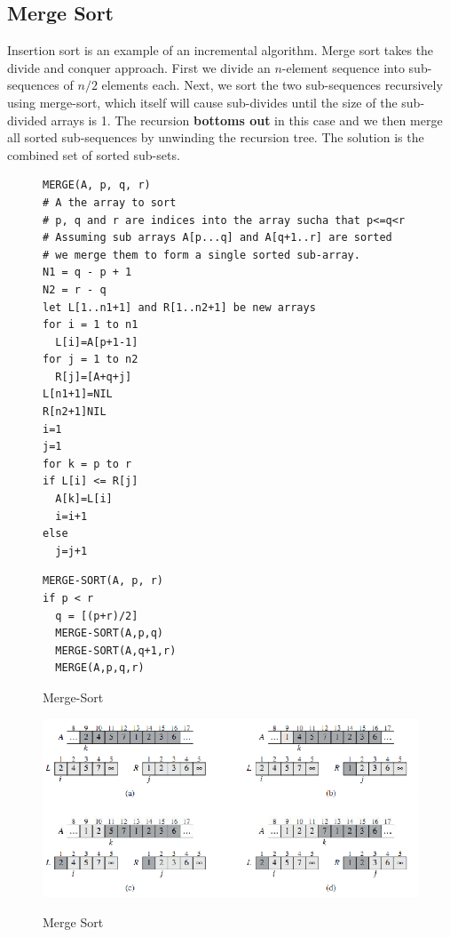 \documentclass[10pt,a4paper]{article}
\begin{document}
\subsection{Merge Sort}
Insertion sort is an example of an incremental algorithm. Merge sort takes the divide and conquer approach. First we divide an $n$-element sequence into sub-sequences of $n/2$ elements each. Next, we sort the two sub-sequences recursively using merge-sort, which itself will cause sub-divides until the size of the sub-divided arrays is 1. The recursion {\bf bottoms out} in this case and we then merge all sorted sub-sequences by unwinding the recursion tree. The solution is the combined set of sorted sub-sets. 
\begin{figure}
\caption{Merge-Sort}
\begin{center}
\begin{lstlisting}
MERGE(A, p, q, r)
# A the array to sort
# p, q and r are indices into the array sucha that p<=q<r
# Assuming sub arrays A[p...q] and A[q+1..r] are sorted
# we merge them to form a single sorted sub-array. 
N1 = q - p + 1
N2 = r - q
let L[1..n1+1] and R[1..n2+1] be new arrays
for i = 1 to n1
  L[i]=A[p+1-1]
for j = 1 to n2
  R[j]=[A+q+j]
L[n1+1]=NIL
R[n2+1]NIL
i=1
j=1
for k = p to r
if L[i] <= R[j]
  A[k]=L[i]
  i=i+1
else
  j=j+1
\end{lstlisting}
\begin{lstlisting}
MERGE-SORT(A, p, r)
if p < r
  q = [(p+r)/2]
  MERGE-SORT(A,p,q)
  MERGE-SORT(A,q+1,r)
  MERGE(A,p,q,r)
\end{lstlisting}
\label{mslisting}
\end{center}
\end{figure}
\begin{figure}
\caption{Merge Sort\cite{INTROALG}}
\begin{center}
\includegraphics[scale=0.42]{../images/mergesort.png}
\label{mergesort}
\end{center}
\end{figure}
\end{document}
